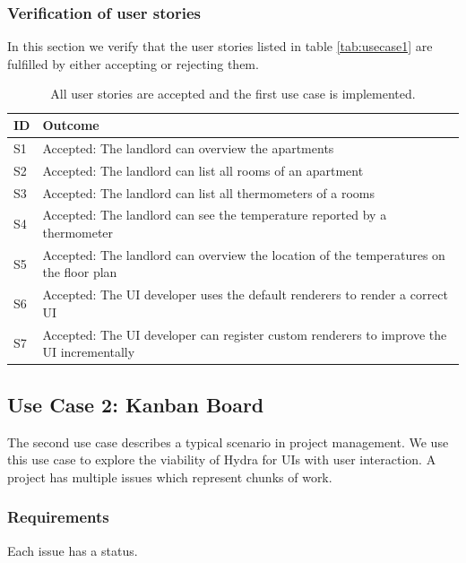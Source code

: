 \subsubsection{Verification of user stories}
In this section we verify that the user stories listed in table \ref{tab:usecase1} are fulfilled by either accepting or rejecting them.

\clearpage

\begin{table}[!htb]
  \begin{center}
    \begin{tabular}{ |l|l| }
      \hline
      \textbf{ID} & \textbf{Outcome} \\
      \hline
      S1 & Accepted: The landlord can overview the apartments \\
      \hline
      S2 & Accepted: The landlord can list all rooms of an apartment \\
      \hline
      S3 & Accepted: The landlord can list all thermometers of a rooms \\
      \hline
      S4 & Accepted: The landlord can see the temperature reported by a thermometer \\
      \hline
      S5 & Accepted: The landlord can overview the location of the temperatures on the floor plan \\
      \hline
      S6 & Accepted: The UI developer uses the default renderers to render a correct UI \\
      \hline
      S7 & Accepted: The UI developer can register custom renderers to improve the UI incrementally \\
      \hline
    \end{tabular}
    \caption{All user stories are accepted and the first use case is implemented.}
  \end{center}
\end{table}

\subsection{Use Case 2: Kanban Board}
The second use case describes a typical scenario in project management. We use this use case to explore the viability of Hydra for UIs with user interaction. A project has multiple issues which represent chunks of work.

\subsubsection{Requirements}
Each issue has a status.

